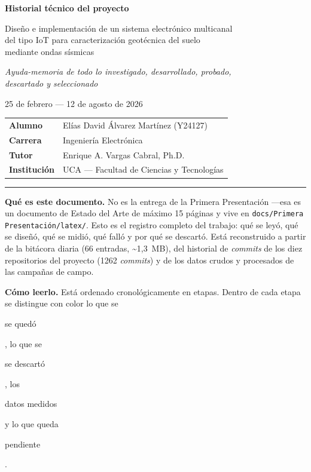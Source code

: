 \documentclass[11pt,a4paper]{article}
\begin{document}
\thispagestyle{empty}
\begin{center}
    \vspace*{1.5cm}
    {\Large\bfseries Historial t\'ecnico del proyecto}\par
    \vspace{0.5cm}
    {\large Dise\~no e implementaci\'on de un sistema electr\'onico multicanal\\
    del tipo IoT para caracterizaci\'on geot\'ecnica del suelo\\
    mediante ondas s\'ismicas}\par
    \vspace{1.0cm}
    {\itshape Ayuda-memoria de todo lo investigado, desarrollado, probado,\\
    descartado y seleccionado}\par
    \vspace{0.3cm}
    {25 de febrero --- 12 de agosto de 2026}\par
    \vspace{1.2cm}
    \begin{tabularx}{0.8\textwidth}{@{}lX@{}}
    \textbf{Alumno} & El\'ias David \'Alvarez Mart\'inez (Y24127) \\
    \textbf{Carrera} & Ingenier\'ia Electr\'onica \\
    \textbf{Tutor} & Enrique A. Vargas Cabral, Ph.D. \\
    \textbf{Instituci\'on} & UCA --- Facultad de Ciencias y Tecnolog\'ias \\
    \end{tabularx}
\end{center}

\vspace{1.0cm}
\hrule
\vspace{0.5cm}

\noindent\textbf{Qu\'e es este documento.} No es la entrega de la Primera
Presentaci\'on ---esa es un documento de Estado del Arte de m\'aximo 15
p\'aginas y vive en \texttt{docs/Primera Presentaci\'on/latex/}. Esto es el
registro completo del trabajo: qu\'e se ley\'o, qu\'e se dise\~n\'o, qu\'e se
midi\'o, qu\'e fall\'o y por qu\'e se descart\'o. Est\'a reconstruido a partir de
la bit\'acora diaria (66 entradas, \textasciitilde{}1{,}3~MB), del historial de
\emph{commits} de los diez repositorios del proyecto (1262 \emph{commits}) y de
los datos crudos y procesados de las campa\~nas de campo.

\vspace{0.3cm}
\noindent\textbf{C\'omo leerlo.} Est\'a ordenado cronol\'ogicamente en etapas.
Dentro de cada etapa se distingue con color lo que se
\colorbox{cajaSel}{\strut se qued\'o}, lo que se
\colorbox{cajaDesc}{\strut se descart\'o}, los
\colorbox{cajaDato}{\strut datos medidos} y lo que queda
\colorbox{cajaDuda}{\strut pendiente}.
\end{document}
